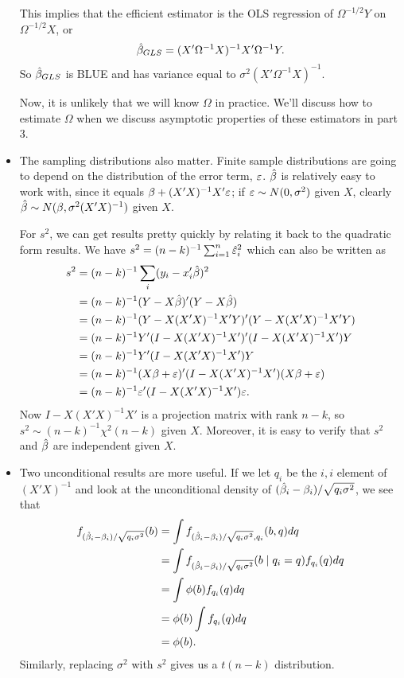 \begin{itemize}[leftmargin=0pt]
  This implies that the efficient estimator is the OLS regression of
  $\Omega^{-1/2} Y$ on $\Omega^{-1/2} X$, or
  \begin{equation*}
    \hat{\beta}_{GLS} = (X'\Omega^{-1}X)^{-1}X'\Omega^{-1}Y.
  \end{equation*}
  So $\hat{\beta}_{GLS}$ is BLUE and has variance equal to $\sigma^2 (X' \Omega^{-1}
  X)^{-1}$.

  Now, it is unlikely that we will know $\Omega$ in practice.  We'll
  discuss how to estimate $\Omega$ when we discuss asymptotic properties of
  these estimators in part 3.

\item The sampling distributions also matter.  Finite sample
  distributions are going to depend on the distribution of the error
  term, $\varepsilon$.  $\hat{\beta}$ is relatively easy to work with, since it equals
  $\beta + (X'X)^{-1} X'\varepsilon$; if $\varepsilon \sim N(0, \sigma^2)$ given $X$, clearly
  $\hat{\beta} \sim N(\beta, \sigma^2(X'X)^{-1})$ given $X$.

  For $s^2$, we can get results pretty quickly by relating it back to
  the quadratic form results. We have $s^2 = (n-k)^{-1} \sum_{i=1}^n \hat{\varepsilon}^2_i$
  which can also be written as
  \begin{align*}
    s^2 &= (n-k)^{-1} \sum_i (y_i - x_i'\hat{\beta})^2 \\
    &= (n-k)^{-1} (Y - X\hat{\beta})'(Y - X\hat{\beta}) \\
    &= (n-k)^{-1} (Y - X(X'X)^{-1}X'Y)'(Y - X(X'X)^{-1}X'Y) \\
    &= (n-k)^{-1} Y'(I - X(X'X)^{-1}X')'(I - X(X'X)^{-1}X')Y \\
    &= (n-k)^{-1} Y'(I - X(X'X)^{-1}X')Y \\
    &= (n-k)^{-1} (X\beta + \varepsilon)'(I - X(X'X)^{-1}X')(X\beta + \varepsilon) \\
    &= (n-k)^{-1} \varepsilon'(I - X(X'X)^{-1}X')\varepsilon.
  \end{align*}
  Now $I - X(X'X)^{-1}X'$ is a projection matrix with rank $n-k$, so
  $s^2 \sim (n-k)^{-1} \chi^2(n-k)$ given $X$.  Moreover, it is easy to verify
  that $s^2$ and $\hat{\beta}$ are independent given $X$.

\item Two unconditional results are more useful.  If we let $q_i$ be
  the $i,i$ element of $(X'X)^{-1}$ and look at the unconditional
  density of $(\hat{\beta}_i - \beta_i)/\sqrt{q_i \sigma^2}$, we see that
  \begin{align*}
    f_{(\hat{\beta}_i - \beta_i)/\sqrt{q_i \sigma^2}}(b)
    &= \int f_{(\hat{\beta}_i - \beta_i)/\sqrt{q_i \sigma^2}, q_i} (b, q) dq \\
    &= \int f_{(\hat{\beta}_i - \beta_i)/\sqrt{q_i \sigma^2}}(b \mid q_i = q) f_{q_i}(q) dq \\
    &= \int \phi(b) f_{q_i}(q) dq \\
    &= \phi(b) \int f_{q_i}(q) dq \\
    &= \phi(b).
  \end{align*}
  Similarly, replacing $\sigma^2$ with $s^2$ gives us a $t(n-k)$ distribution.

\end{itemize}


